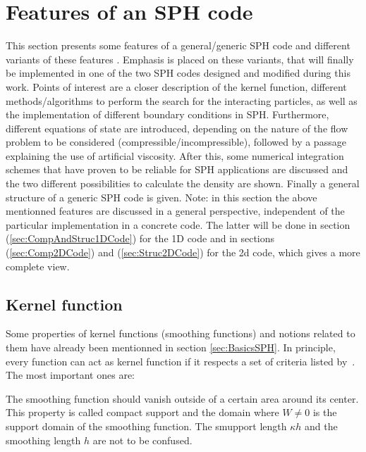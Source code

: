\documentclass{report}
\begin{document}
\section{Features of an SPH code}
\label{sec:FeaturesOfSPH}
This section presents some features of a general/generic SPH code and different variants of these features . Emphasis is
placed on these variants, that will finally be implemented in one of the
two SPH codes designed and modified during this work.
Points of interest are a closer description of the kernel function, different methods/algorithms to perform the search for the interacting particles, as well as the implementation of different boundary conditions in
SPH. Furthermore, different
equations of state are introduced, depending on the nature of the flow problem
to be considered (compressible/incompressible), followed by a passage
explaining the use of artificial viscosity. After this, some numerical
integration schemes that have proven to be reliable for SPH applications are discussed and the two different possibilities to calculate the density are shown. Finally a general structure of a generic SPH code is given.
Note: in this section the above mentionned features are discussed in a general perspective, independent of the particular implementation in a concrete code. The latter will be done in section (\ref{sec:CompAndStruc1DCode}) for the 1D code and in sections (\ref{sec:Comp2DCode}) and (\ref{sec:Struc2DCode}) for the 2d code, which gives a more complete view.




\subsection{Kernel function}
\label{sec:KernelFunction}


Some properties of kernel functions (smoothing functions) and notions related
to them have already been mentionned in section
\ref{sec:BasicsSPH}. In principle, every function can act as kernel function
if it respects a set of criteria listed by~\cite{Liu2003}.
The most important ones are:

The smoothing function should vanish outside of a certain area around its
center. This property is called compact support and the domain where $W\neq0$
is the support domain of the smoothing function. The smupport length $\kappa h$ and the
smoothing length $h$ are not to be confused.
 
\end{document}
